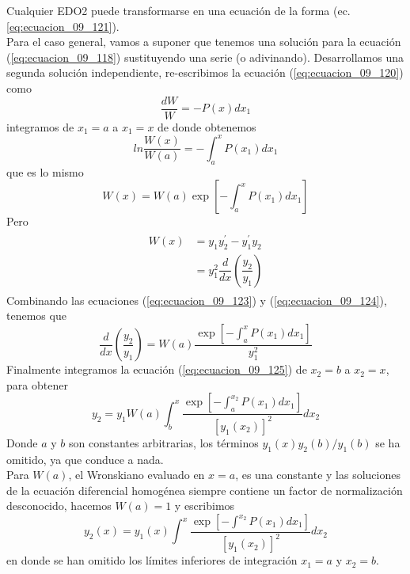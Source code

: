 Cualquier EDO2 puede transformarse en una ecuación de la forma (ec. \ref{eq:ecuacion_09_121}).
\\
Para el caso general, vamos a suponer que tenemos una solución para la ecuación (\ref{eq:ecuacion_09_118}) sustituyendo una serie (o adivinando). Desarrollamos una segunda solución independiente, re-escribimos la ecuación (\ref{eq:ecuacion_09_120}) como
\[ \dfrac{d W}{W} = - P(x) d x_{1} \]
integramos de $x_{1} = a$ a $x_{1} =  x$ de donde obtenemos
\[ ln \dfrac{W(x)}{W(a)} = - \int_{a}^{x} P(x_{1}) dx_{1}  \]
que es lo mismo
\begin{equation}
W(x) = W(a) \exp \left[ - \int_{a}^{x} P(x_{1}) d x_{1} \right]
\label{eq:ecuacion_09_123}
\end{equation}
Pero
\begin{eqnarray}
\begin{aligned}
W(x) &= y_{1} y^{\prime}_{2} - y^{\prime}_{1} y_{2} \\
&= y^{2}_{1} \dfrac{d}{dx} \left( \dfrac{y_{2}}{y_{1}} \right)
\end{aligned}
 \label{eq:ecuacion_09_124}
\end{eqnarray}
Combinando las ecuaciones (\ref{eq:ecuacion_09_123}) y (\ref{eq:ecuacion_09_124}), tenemos que
\begin{equation}
\dfrac{d}{dx} \left( \dfrac{y_{2}}{y_{1}} \right) =  W(a) \dfrac{\exp \left[ - \int_{a}^{x} P(x_{1}) d x_{1} \right]}{y^{2}_{1}}
\label{eq:ecuacion_09_125}
\end{equation}
Finalmente integramos la ecuación (\ref{eq:ecuacion_09_125}) de $x_{2} = b$ a $x_{2} = x$, para obtener
\begin{equation}
y_{2} = y_{1} W(a) \int_{b}^{x} \dfrac{\exp \left[ - \int_{a}^{x_{2}} P(x_{1}) d x_{1} \right]}{[y_{1}(x_{2})]^{2}} dx_{2}
\label{eq:ecuacion_09_126}
\end{equation}
Donde $a$ y $b$ son constantes arbitrarias, los términos $y_{1}(x)y_{2}(b)/y_{1}(b)$ se ha omitido, ya que conduce a nada.
\\
Para $W(a)$, el Wronskiano evaluado en $x=a$, es una constante y las soluciones de la ecuación diferencial homogénea siempre contiene un factor de normalización desconocido, hacemos $W(a)=1$ y escribimos
\begin{equation}
y_{2}(x) =  y_{1}(x) \int^{x} \dfrac{\exp \left[ - \int^{x_{2}} P(x_{1}) d x_{1} \right]}{[y_{1}(x_{2})]^{2}} dx_{2}
\label{eq:ecuacion_09_127}
\end{equation}
en donde se han omitido los límites inferiores de integración $x_{1} = a$ y $x_{2}=b$. 
